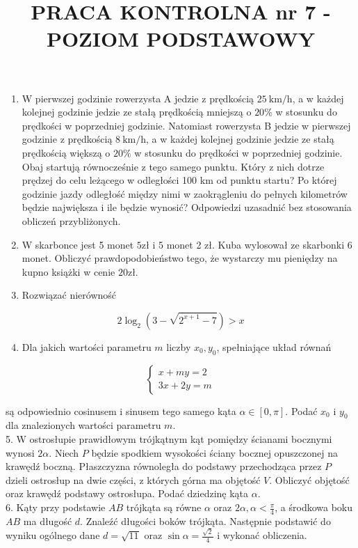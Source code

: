 \documentclass[10pt]{article}
\title{PRACA KONTROLNA nr 7 - POZIOM PODSTAWOWY }
\author{}
\date{}
\begin{document}
\maketitle
\begin{enumerate}
  \item W pierwszej godzinie rowerzysta A jedzie z prędkością $25 \mathrm{~km} / \mathrm{h}$, a w każdej kolejnej godzinie jedzie ze stałą prędkością mniejszą o $20 \%$ w stosunku do prędkości w poprzedniej godzinie. Natomiast rowerzysta B jedzie w pierwszej godzinie z prędkością $8 \mathrm{~km} / \mathrm{h}$, a w każdej kolejnej godzinie jedzie ze stałą prędkością większą o $20 \%$ w stosunku do prędkości w poprzedniej godzinie. Obaj startują równocześnie z tego samego punktu. Który z nich dotrze prędzej do celu leżącego w odległości 100 km od punktu startu? Po której godzinie jazdy odległość między nimi w zaokrągleniu do pełnych kilometrów będzie największa i ile będzie wynosić? Odpowiedzi uzasadnić bez stosowania obliczeń przybliżonych.
  \item W skarbonce jest 5 monet $5 \mathrm{zł}$ i 5 monet 2 zł. Kuba wylosował ze skarbonki 6 monet. Obliczyć prawdopodobieństwo tego, że wystarczy mu pieniędzy na kupno książki w cenie $20 \mathrm{zł}$.
  \item Rozwiązać nierówność
\end{enumerate}

$$
2 \log _{2}\left(3-\sqrt{2^{x+1}-7}\right)>x
$$

\begin{enumerate}
  \setcounter{enumi}{3}
  \item Dla jakich wartości parametru $m$ liczby $x_{0}, y_{0}$, spełniające układ równań
\end{enumerate}

$$
\left\{\begin{array}{l}
x+m y=2 \\
3 x+2 y=m
\end{array}\right.
$$

są odpowiednio cosinusem i sinusem tego samego kąta $\alpha \in[0, \pi]$. Podać $x_{0}$ i $y_{0}$ dla znalezionych wartości parametru $m$.\\
5. W ostrosłupie prawidłowym trójkątnym kąt pomiędzy ścianami bocznymi wynosi $2 \alpha$. Niech $P$ będzie spodkiem wysokości ściany bocznej opuszczonej na krawędź boczną. Płaszczyzna równoległa do podstawy przechodząca przez $P$ dzieli ostrosłup na dwie części, z których górna ma objętość $V$. Obliczyć objętość oraz krawędź podstawy ostrosłupa. Podać dziedzinę kąta $\alpha$.\\
6. Kąty przy podstawie $A B$ trójkąta są równe $\alpha$ oraz $2 \alpha, \alpha<\frac{\pi}{4}$, a środkowa boku $A B$ ma długość $d$. Znaleźć długości boków trójkąta. Następnie podstawić do wyniku ogólnego dane $d=\sqrt{11}$ oraz $\sin \alpha=\frac{\sqrt{2}}{4}$ i wykonać obliczenia.
\end{document}
